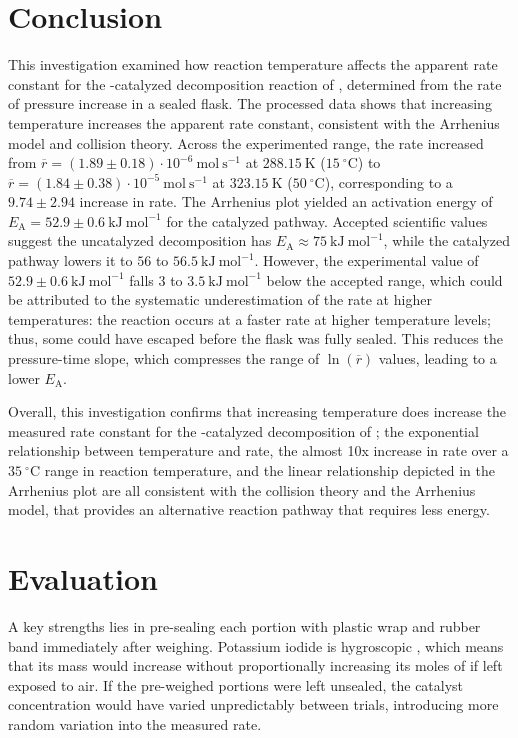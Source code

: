 \documentclass[hyphens]{article}
\begin{document}
\section{Conclusion}
\label{sec:conclusion}
\indent \indent This investigation examined how reaction temperature affects the apparent rate constant for the -catalyzed decomposition reaction of , determined from the rate of  pressure increase in a sealed flask. The processed data shows that increasing temperature increases the apparent rate constant, consistent with the Arrhenius model and collision theory. Across the experimented range, the rate increased from $\overline{r} = (1.89 \pm 0.18) \cdot 10^{-6}\ \text{mol}\ \text{s}^{-1}$ at $288.15\ \text{K}$ ($15\ ^\circ \text{C}$) to $\overline{r} = (1.84 \pm 0.38) \cdot 10^{-5}\ \text{mol}\ \text{s}^{-1}$ at $323.15\ \text{K}$ ($50\ ^\circ \text{C}$), corresponding to a $9.74 \pm 2.94$ increase in rate. The Arrhenius plot yielded an activation energy of $E_\text{A} = 52.9 \pm 0.6\ \text{kJ}\ \text{mol}^{-1}$ for the catalyzed pathway. Accepted scientific values suggest the uncatalyzed decomposition has $E_\text{A} \approx 75\ \text{kJ}\ \text{mol}^{-1}$, while the catalyzed pathway lowers it to $56$ to $56.5\ \text{kJ}\ \text{mol}^{-1}$. However, the experimental value of $52.9 \pm 0.6\ \text{kJ}\ \text{mol}^{-1}$ falls $3$ to $3.5\ \text{kJ}\ \text{mol}^{-1}$ below the accepted range, which could be attributed to the systematic underestimation of the rate at higher temperatures: the reaction occurs at a faster rate at higher temperature levels; thus, some  could have escaped before the flask was fully sealed. This reduces the pressure-time slope, which compresses the range of $\ln{(\overline{r})}$ values, leading to a lower $E_\text{A}$.

Overall, this investigation confirms that increasing temperature does increase the measured rate constant for the -catalyzed decomposition of ; the exponential relationship between temperature and rate, the almost 10x increase in rate over a $35\ ^\circ \text{C}$ range in reaction temperature, and the linear relationship depicted in the Arrhenius plot are all consistent with the collision theory and the Arrhenius model, that  provides an alternative reaction pathway that requires less energy.

\section{Evaluation}
\label{sec:evaluation}
\indent \indent A key strengths lies in pre-sealing each  portion with plastic wrap and rubber band immediately after weighing. Potassium iodide is hygroscopic \cite{PotassiumIodideUSP}, which means that its mass would increase without proportionally increasing its moles of  if left exposed to air. If the pre-weighed  portions were left unsealed, the catalyst concentration would have varied unpredictably between trials, introducing more random variation into the measured rate.
\end{document}
